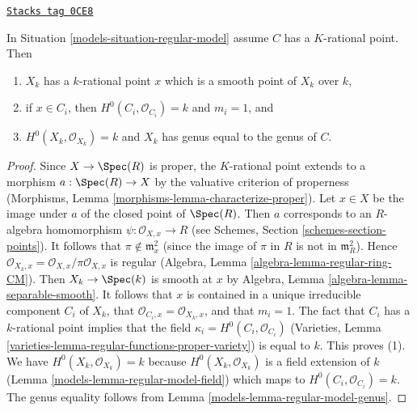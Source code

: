\begin{lemma}
\label{models-lemma-numerical-type-rational-point}
\href{https://stacks.math.columbia.edu/tag/0CE8}{\texttt{Stacks tag 0CE8}}

In Situation \ref{models-situation-regular-model} assume $C$ has a $K$-rational point.
Then
\begin{enumerate}
\item $X_k$ has a $k$-rational point $x$ which is a smooth point of $X_k$
over $k$,
\item if $x \in C_i$, then $H^0(C_i, \mathcal{O}_{C_i}) = k$ and
$m_i = 1$, and
\item $H^0(X_k, \mathcal{O}_{X_k}) = k$ and $X_k$ has genus equal to
the genus of $C$.
\end{enumerate}
\end{lemma}

\begin{proof}

Since $X \to \Spec(R)$ is proper, the $K$-rational point extends to
a morphism $a : \Spec(R) \to X$ by the valuative criterion of properness
(Morphisms, Lemma \ref{morphisms-lemma-characterize-proper}).
Let $x \in X$ be the image under $a$ of the closed point of $\Spec(R)$.
Then $a$ corresponds to an $R$-algebra homomorphism
$\psi : \mathcal{O}_{X, x} \to R$
(see Schemes, Section \ref{schemes-section-points}).
It follows that $\pi \not \in \mathfrak m_x^2$ (since the image
of $\pi$ in $R$ is not in $\mathfrak m_R^2$).
Hence $\mathcal{O}_{X_k, x} = \mathcal{O}_{X, x}/\pi \mathcal{O}_{X, x}$
is regular (Algebra, Lemma \ref{algebra-lemma-regular-ring-CM}).
Then $X_k \to \Spec(k)$ is smooth at $x$ by
Algebra, Lemma \ref{algebra-lemma-separable-smooth}.
It follows that $x$ is contained in a unique irreducible component
$C_i$ of $X_k$, that $\mathcal{O}_{C_i, x} = \mathcal{O}_{X_k, x}$,
and that $m_i = 1$. The fact that $C_i$ has a
$k$-rational point implies that the field
$\kappa_i = H^0(C_i, \mathcal{O}_{C_i})$
(Varieties, Lemma \ref{varieties-lemma-regular-functions-proper-variety})
is equal to $k$. This proves (1). We have
$H^0(X_k, \mathcal{O}_{X_k}) = k$
because $H^0(X_k, \mathcal{O}_{X_k})$ is a field
extension of $k$ (Lemma \ref{models-lemma-regular-model-field})
which maps to $H^0(C_i, \mathcal{O}_{C_i}) = k$.
The genus equality follows from Lemma \ref{models-lemma-regular-model-genus}.
\end{proof}

